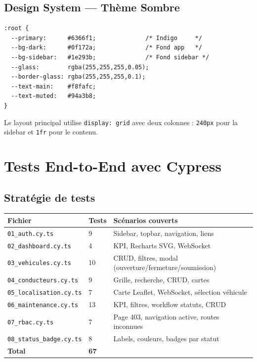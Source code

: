 \documentclass[12pt,a4paper]{report}
\begin{document}
\section{Design System — Thème Sombre}

\begin{lstlisting}[style=shell, caption=Variables CSS du design system (\texttt{App.css})]
:root {
  --primary:      #6366f1;              /* Indigo     */
  --bg-dark:      #0f172a;              /* Fond app   */
  --bg-sidebar:   #1e293b;              /* Fond sidebar */
  --glass:        rgba(255,255,255,0.05);
  --border-glass: rgba(255,255,255,0.1);
  --text-main:    #f8fafc;
  --text-muted:   #94a3b8;
}
\end{lstlisting}

Le layout principal utilise \texttt{display: grid} avec deux colonnes :
\texttt{240px} pour la sidebar et \texttt{1fr} pour le contenu.

\chapter{Tests End-to-End avec Cypress}

\section{Stratégie de tests}

\begin{center}
\begin{tabular}{|l|C{1.5cm}|l|}
  \hline
  \textbf{Fichier} & \textbf{Tests} & \textbf{Scénarios couverts} \\
  \hline
  \texttt{01\_auth.cy.ts}          & 9  & Sidebar, topbar, navigation, liens \\
  \texttt{02\_dashboard.cy.ts}     & 4  & KPI, Recharts SVG, WebSocket \\
  \texttt{03\_vehicules.cy.ts}     & 10 & CRUD, filtres, modal (ouverture/fermeture/soumission) \\
  \texttt{04\_conducteurs.cy.ts}   & 9  & Grille, recherche, CRUD, cartes \\
  \texttt{05\_localisation.cy.ts}  & 7  & Carte Leaflet, WebSocket, sélection véhicule \\
  \texttt{06\_maintenance.cy.ts}   & 13 & KPI, filtres, workflow statuts, CRUD \\
  \texttt{07\_rbac.cy.ts}          & 7  & Page 403, navigation active, routes inconnues \\
  \texttt{08\_status\_badge.cy.ts} & 8  & Labels, couleurs, badges par statut \\
  \hline
  \textbf{Total}                   & \textbf{67} & \\
  \hline
\end{tabular}
\end{center}
\end{document}
